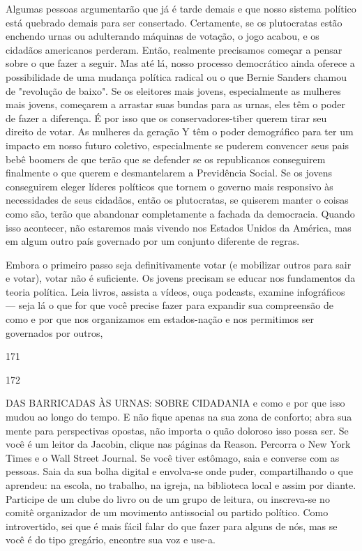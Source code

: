 Algumas pessoas argumentarão que já é tarde demais e que nosso sistema político está quebrado demais para ser consertado. Certamente, se os plutocratas estão enchendo urnas ou adulterando máquinas de votação, o jogo acabou, e os cidadãos americanos perderam. Então, realmente precisamos começar a pensar sobre o que fazer a seguir. Mas até lá, nosso processo democrático ainda oferece a possibilidade de uma mudança política radical ou o que Bernie Sanders chamou de "revolução de baixo". Se os eleitores mais jovens, especialmente as mulheres mais jovens, começarem a arrastar suas bundas para as urnas, eles têm o poder de fazer a diferença. É por isso que os conservadores-tiber querem tirar seu direito de votar. As mulheres da geração Y têm o poder demográfico para ter um impacto em nosso futuro coletivo, especialmente se puderem convencer seus pais bebê boomers de que terão que se defender se os republicanos conseguirem finalmente o que querem e desmantelarem a Previdência Social. Se os jovens conseguirem eleger líderes políticos que tornem o governo mais responsivo às necessidades de seus cidadãos, então os plutocratas, se quiserem manter o coisas como são, terão que abandonar completamente a fachada da democracia. Quando isso acontecer, não estaremos mais vivendo nos Estados Unidos da América, mas em algum outro país governado por um conjunto diferente de regras.
 \par 
Embora o primeiro passo seja definitivamente votar (e mobilizar outros para sair e votar), votar não é suficiente. Os jovens precisam se educar nos fundamentos da teoria política. Leia livros, assista a vídeos, ouça podcasts, examine infográficos — seja lá o que for que você precise fazer para expandir sua compreensão de como e por que nos organizamos em estados-nação e nos permitimos ser governados por outros,
 \par 
171
 \par 
172
 \par 
DAS BARRICADAS ÀS URNAS: SOBRE CIDADANIA e como e por que isso mudou ao longo do tempo. E não fique apenas na sua zona de conforto; abra sua mente para perspectivas opostas, não importa o quão doloroso isso possa ser. Se você é um leitor da Jacobin, clique nas páginas da Reason. Percorra o New York Times e o Wall Street Journal. Se você tiver estômago, saia e converse com as pessoas. Saia da sua bolha digital e envolva-se onde puder, compartilhando o que aprendeu: na escola, no trabalho, na igreja, na biblioteca local e assim por diante. Participe de um clube do livro ou de um grupo de leitura, ou inscreva-se no comitê organizador de um movimento antissocial ou partido político. Como introvertido, sei que é mais fácil falar do que fazer para alguns de nós, mas se você é do tipo gregário, encontre sua voz e use-a.
